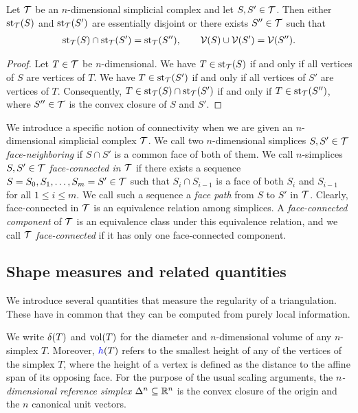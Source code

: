\documentclass[10pt,a4paper]{article}
\begin{document}
\begin{lemma}
 Let ${\mathcal T}$ be an $n$-dimensional simplicial complex and let $S,S' \in {\mathcal T}$.
 Then either $\operatorname{st}_{{\mathcal T}}(S)$ and $\operatorname{st}_{{\mathcal T}}(S')$ are essentially disjoint or there exists $S'' \in {\mathcal T}$
 such that 
 \begin{align*}
    \operatorname{st}_{{\mathcal T}}(S) \cap \operatorname{st}_{{\mathcal T}}(S') = \operatorname{st}_{{\mathcal T}}(S''),
    \qquad 
    {\mathcal V}(S) \cup {\mathcal V}(S') = {\mathcal V}(S'').
 \end{align*}
\end{lemma}
\begin{proof}
 Let $T \in {\mathcal T}$ be $n$-dimensional.
 We have $T \in \operatorname{st}_{{\mathcal T}}(S )$ if and only if all vertices of $S $ are vertices of $T$.
 We have $T \in \operatorname{st}_{{\mathcal T}}(S')$ if and only if all vertices of $S'$ are vertices of $T$.
 Consequently, $T \in \operatorname{st}_{{\mathcal T}}(S) \cap \operatorname{st}_{{\mathcal T}}(S')$ if and only if $T \in \operatorname{st}_{{\mathcal T}}(S'')$,
 where $S'' \in {\mathcal T}$ is the convex closure of $S$ and $S'$.
\end{proof}

We introduce a specific notion of connectivity when we are given an $n$-dimensional simplicial complex ${\mathcal T}$. 
We call two $n$-dimensional simplices $S, S' \in {\mathcal T}$ \emph{face-neighboring} if $S \cap S'$ is a common face of both of them. 
We call $n$-simplices $S,S' \in {\mathcal T}$ \emph{face-connected in ${\mathcal T}$} if there exists a sequence $S=S_0,S_1,\dots,S_m=S' \in {\mathcal T}$ such that $S_{i} \cap S_{i-1}$ is a face of both $S_{i}$ and $S_{i-1}$ for all $1 \leq i \leq m$. 
We call such a sequence a \emph{face path} from $S$ to $S'$ in ${\mathcal T}$. 
Clearly, face-connected in ${\mathcal T}$ is an equivalence relation among simplices. 
A \emph{face-connected component} of ${\mathcal T}$ is an equivalence class under this equivalence relation, 
and we call ${\mathcal T}$ \emph{face-connected} if it has only one face-connected component. 


\subsection{Shape measures and related quantities}

We introduce several quantities that measure the regularity of a triangulation. 
These have in common that they can be computed from purely local information. 

We write ${\delta}(T)$ and $\operatorname{vol}(T)$ for the diameter and $n$-dimensional volume of any $n$-simplex $T$.
Moreover, $\height(T)$ refers to the smallest height of any of the vertices of the simplex $T$,
where the height of a vertex is defined as the distance to the affine span of its opposing face.
For the purpose of the usual scaling arguments, the \emph{$n$-dimensional reference simplex} $\Delta^n \subseteq {\mathbb R}^n$ is the convex closure of the origin and the $n$ canonical unit vectors. 
\end{document}
